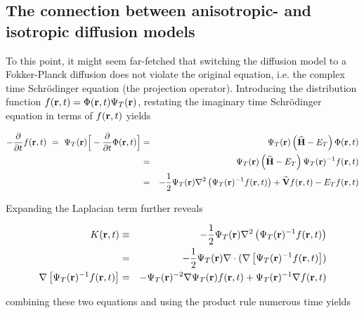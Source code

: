 \subsection{The connection between anisotropic- and isotropic diffusion models}
\label{sec:ConnectAnisIs}

To this point, it might seem far-fetched that switching the diffusion model to a Fokker-Planck diffusion does not violate the original equation, i.e. the complex time Schrödinger equation (the projection operator). Introducing the distribution function $f(\mathbf{r}, t) = \Phi(\mathbf{r}, t)\Psi_T(\mathbf{r})$, restating the imaginary time Schrödinger equation in terms of $f(\mathbf{r}, t)$ yields

\begin{eqnarray}
-\frac{\partial}{\partial t}f(\mathbf{r}, t)\,\, = \,\,\Psi_T(\mathbf{r})\Big[-\frac{\partial}{\partial t}\Phi(\mathbf{r}, t)\Big] &=& \Psi_T(\mathbf{r})\left({\bf\widehat{H}} - E_T\right)\Phi(\mathbf{r}, t) \nonumber\\
         &=& \Psi_T(\mathbf{r})\left({\bf\widehat{H}} - E_T\right)\Psi_T(\mathbf{r})^{-1}f(\mathbf{r}, t) \label{eq:impSamplRaw}\\
         &=& -\frac{1}{2}\Psi_T(\mathbf{r})\nabla^2 \left(\Psi_T(\mathbf{r})^{-1}f(\mathbf{r}, t)\right) + {\bf\widehat{V}}f(\mathbf{r}, t) - E_Tf(\mathbf{r},t)\nonumber
\end{eqnarray}

Expanding the Laplacian term further reveals

\begin{eqnarray}
K(\mathbf{r}, t) &\equiv& -\frac{1}{2}\Psi_T(\mathbf{r})\nabla^2 \left(\Psi_T(\mathbf{r})^{-1}f(\mathbf{r}, t)\right) \nonumber\\
 &=& -\frac{1}{2}\Psi_T(\mathbf{r})\nabla\cdot (\nabla\left[\Psi_T(\mathbf{r})^{-1}f(\mathbf{r}, t)\right]) \\
\nabla\left[\Psi_T(\mathbf{r})^{-1}f(\mathbf{r}, t)\right] &=& -\Psi_T(\mathbf{r})^{-2}\nabla \Psi_T(\mathbf{r}) f(\mathbf{r}, t) + \Psi_T(\mathbf{r})^{-1}\nabla f(\mathbf{r}, t)
\end{eqnarray}

combining these two equations and using the product rule numerous time yields

